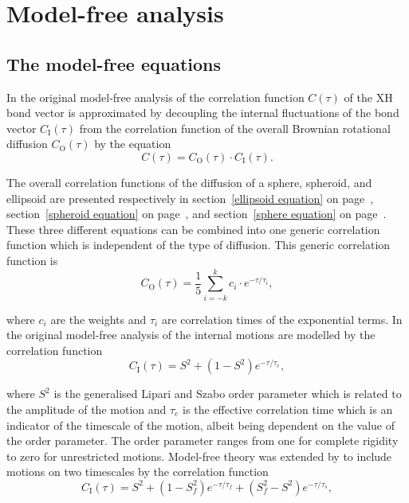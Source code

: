 
\newpage
\section{Model-free analysis}




\subsection{The model-free equations}

In the original model-free analysis of \cite{LipariSzabo82a} the correlation function $C(\tau)$ of the XH bond vector is approximated by decoupling the internal fluctuations of the bond vector $C_\mathrm{I}(\tau)$ from the correlation function of the overall Brownian rotational diffusion $C_\mathrm{O}(\tau)$ by the equation
\begin{equation}
    C(\tau) = C_\mathrm{O}(\tau) \cdot C_\mathrm{I}(\tau).
\end{equation}

\noindent The overall correlation functions of the diffusion of a sphere, spheroid, and ellipsoid are presented respectively in section~\ref{ellipsoid equation} on page~\pageref{ellipsoid equation}, section~\ref{spheroid equation} on page~\pageref{spheroid equation}, and section~\ref{sphere equation} on page~\pageref{sphere equation}.  These three different equations can be combined into one generic correlation function which is independent of the type of diffusion.  This generic correlation function is
\begin{equation}
    C_\mathrm{O}(\tau) = \frac{1}{5} \sum_{i=-k}^k c_i \cdot e^{-\tau/\tau_i},
\end{equation}

\noindent where $c_i$ are the weights and $\tau_i$ are correlation times of the exponential terms.  In the original model-free analysis of \citet{LipariSzabo82a,LipariSzabo82b} the internal motions are modelled by the correlation function
\begin{equation}
    C_\mathrm{I}(\tau) = S^2 + (1 - S^2) e^{-\tau / \tau_e},
\end{equation}

\noindent where $S^2$ is the generalised Lipari and Szabo order parameter which is related to the amplitude of the motion and $\tau_e$ is the effective correlation time which is an indicator of the timescale of the motion, albeit being dependent on the value of the order parameter.  The order parameter ranges from one for complete rigidity to zero for unrestricted motions.  Model-free theory was extended by \citet{Clore90a} to include motions on two timescales by the correlation function
\begin{equation}
    C_\mathrm{I}(\tau) = S^2 + (1 - S^2_f) e^{-\tau / \tau_f} + (S^2_f - S^2) e^{-\tau / \tau_s},
\end{equation}

